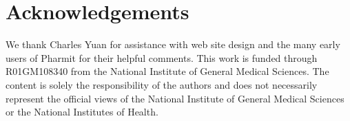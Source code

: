 \section{Acknowledgements}

We thank Charles Yuan for assistance with web site design and the many early users of Pharmit for their helpful comments.
This work is funded through R01GM108340 from the National Institute of General Medical Sciences. The content is solely the responsibility of the authors and does not necessarily represent the official views of the National Institute of General Medical Sciences or the National Institutes of Health.